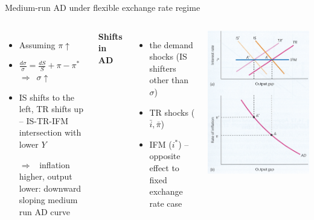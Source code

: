 \documentclass{beamer}
\newcommand{\tr}[1]{{\color{red}{\textbf{#1}}}}
\newcommand{\rarr}{$\Rightarrow$\ }
\begin{document}
\begin{frame}{Medium-run AD under flexible exchange rate regime}
\begin{columns}
\begin{itemize}
\item Assuming $\pi\uparrow$
\item $\frac{d \sigma}{\sigma} = \frac{d S}{S} + \pi  - \pi^*$ \rarr $\sigma\uparrow$
\item IS shifts to the left, TR shifts up -- IS-TR-IFM intersection with lower $Y$
\item[\rarr] inflation higher, output lower: downward sloping medium run AD curve
\end{itemize}
\textbf{Shifts in AD}
\begin{itemize}
  \item \tr{NOT} the demand shocks (IS shifters other than $\sigma$) 
  \item TR shocks ($\bar i, \bar \pi$)
  \item IFM ($i^*$) -- opposite effect to fixed exchange rate case
\end{itemize}

\centering
\includegraphics[clip,width=1\columnwidth]{FIGURES/9_ASAD_Flexible_shortrun.png}


\end{columns}
\end{frame}
\end{document}
